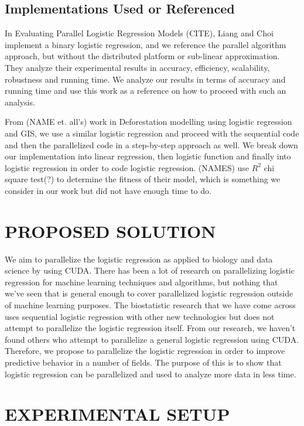 \documentclass[letterpaper, 10 pt, conference]{ieeeconf}  %
\begin{document}
\subsection{Implementations Used or Referenced} 
In Evaluating Parallel Logistic Regression Models (CITE), Liang and Choi implement a binary logistic regression, and we reference the parallel algorithm approach, but without the distributed platform or sub-linear approximation. They analyze their experimental results in accuracy, efficiency, scalability, robustness and running time. We analyze our results in terms of accuracy and running time and use this work as a reference on how to proceed with such an analysis. 

From (NAME et. all’s) work in Deforestation modelling using logistic regression and GIS, we use a similar logistic regression and proceed with the sequential code and then the parallelized code in a step-by-step approach as well. We break down our implementation into linear regression, then logistic function and finally into logistic regression in order to code logistic regression. (NAMES) use $R^2$ chi square test(?) to determine the fitness of their model, which is something we consider in our work but did not have enough time to do.


\section{PROPOSED SOLUTION}
We aim to parallelize the logistic regression as applied to biology and data science by using CUDA. There has been a lot of research on parallelizing logistic regression for machine learning techniques and algorithms, but nothing that we’ve seen that is general enough to cover parallelized logistic regression outside of machine learning purposes. The biostatistic research that we have come across uses sequential logistic regression with other new technologies but does not attempt to parallelize the logistic regression itself. From our research, we haven’t found others who attempt to parallelize a general logistic regression using CUDA. Therefore, we propose to parallelize the logistic regression in order to improve predictive behavior in a number of fields. The purpose of this is to show that logistic regression can be parallelized and used to analyze more data in less time.

\section{EXPERIMENTAL SETUP}
\end{document}

